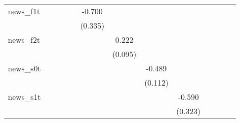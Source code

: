 {\begin{tabular}{l*{12}{c}}
\addlinespace
news\_f1t    &                     &                     &                     &                     &      -0.700\sym{**} &                     &                     &                     &                     &                     &                     &                     \\
            &                     &                     &                     &                     &     (0.335)         &                     &                     &                     &                     &                     &                     &                     \\
\addlinespace
news\_f2t    &                     &                     &                     &                     &                     &       0.222\sym{**} &                     &                     &                     &                     &                     &                     \\
            &                     &                     &                     &                     &                     &     (0.095)         &                     &                     &                     &                     &                     &                     \\
\addlinespace
news\_s0t    &                     &                     &                     &                     &                     &                     &      -0.489\sym{***}&                     &                     &                     &                     &                     \\
            &                     &                     &                     &                     &                     &                     &     (0.112)         &                     &                     &                     &                     &                     \\
\addlinespace
news\_s1t    &                     &                     &                     &                     &                     &                     &                     &      -0.590\sym{*}  &                     &                     &                     &                     \\
            &                     &                     &                     &                     &                     &                     &                     &     (0.323)         &                     &                     &                     &                     \\

\end{tabular}}

